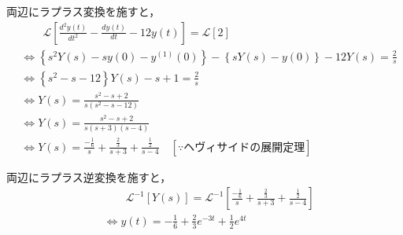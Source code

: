 \documentclass[a4paper,12pt]{article}
\begin{document}
\begin{tcolorbox}[title={[15] つぎの微分方程式をラプラス変換を用いて解け．\\
\[
\frac{d^2y(t)}{dt^2} - \frac{dy(t)}{dt} - 12 y(t) = 2
\]

\quad ただし，初期条件は，\(y(0)=1, y^{(1)}(0)=0\) とする．}]

\quad 両辺にラプラス変換を施すと，
    \vspace{-3mm}
    \begin{align*}
        &\qquad \mathcal{L}\left[ \frac{d^2y(t)}{dt^2} - \frac{dy(t)}{dt} - 12 y(t) \right] 
        = \mathcal{L} \left[ 2 \right] \\
        &\Leftrightarrow \left\{ s^2 Y(s) - sy(0) - y^{(1)}(0) \right\}
        - \left\{ sY(s) - y(0) \right\}
        - 12 Y(s) = \frac{2}{s}  \\
        &\Leftrightarrow \left\{ s^2 - s - 12 \right\} Y(s) - s + 1= \frac{2}{s}  \\
        &\Leftrightarrow Y(s) = \frac{s^2 - s + 2}{s(s^2 - s - 12)}  \\
        &\Leftrightarrow Y(s) =  \frac{s^2 - s + 2}{ s (s + 3)(s - 4) }  \\
        &\Leftrightarrow Y(s) =  \frac{- \frac{1}{6}}{ s } + \frac{  \frac{2}{3} }{ s + 3 } + \frac{  \frac{1}{2} }{ s - 4 } 
        \quad \left[\because ヘヴィサイドの展開定理 \right]
    \end{align*}
        
    \quad 両辺にラプラス逆変換を施すと，
    \vspace{-3mm}
    \begin{align*}
    &\qquad \mathcal{L}^{-1} \left[ Y(s) \right] 
    = \mathcal{L}^{-1} \left[ \frac{- \frac{1}{6}}{ s } + \frac{  \frac{2}{3} }{ s + 3 } + \frac{  \frac{1}{2} }{ s - 4 }  \right] \\
    &\Leftrightarrow y(t) = - \frac{1}{6} + \frac{2}{3}e^{-3t} + \frac{1}{2}e^{4t}
    \end{align*}
\end{tcolorbox}
\end{document}
